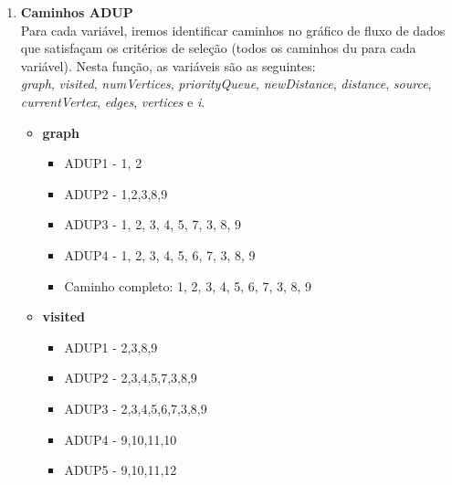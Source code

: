 \documentclass{article}
\begin{document}
\begin{itemize}
\begin{enumerate}
    \item \textbf{Caminhos ADUP}\\
    Para cada variável, iremos identificar caminhos no gráfico de fluxo de dados que satisfaçam os critérios de seleção (todos os caminhos du
para cada variável).
    Nesta função, as variáveis são as seguintes:\\
    \textit{graph}, \textit{visited}, \textit{numVertices}, \textit{priorityQueue}, \textit{newDistance}, \textit{distance}, \textit{source}, \textit{currentVertex}, \textit{edges}, \textit{vertices} e \textit{i}.
    \begin{itemize}
        \item \textbf{graph}
        \begin{itemize}
            \item ADUP1 - 1, 2
            \item ADUP2 - 1,2,3,8,9
            \item ADUP3 - 1, 2, 3, 4, 5, 7, 3, 8, 9
            \item ADUP4 - 1, 2, 3, 4, 5, 6, 7, 3, 8, 9
            \item Caminho completo: 1, 2, 3, 4, 5, 6, 7, 3, 8, 9
        \end{itemize}
        \item \textbf{visited}
        \begin{itemize}
            \item ADUP1 - 2,3,8,9
            \item ADUP2 - 2,3,4,5,7,3,8,9
            \item ADUP3 - 2,3,4,5,6,7,3,8,9
            \item ADUP4 - 9,10,11,10
            \item ADUP5 - 9,10,11,12
    

\end{itemize}
\end{itemize}
\end{enumerate}
\end{itemize}
\end{document}
